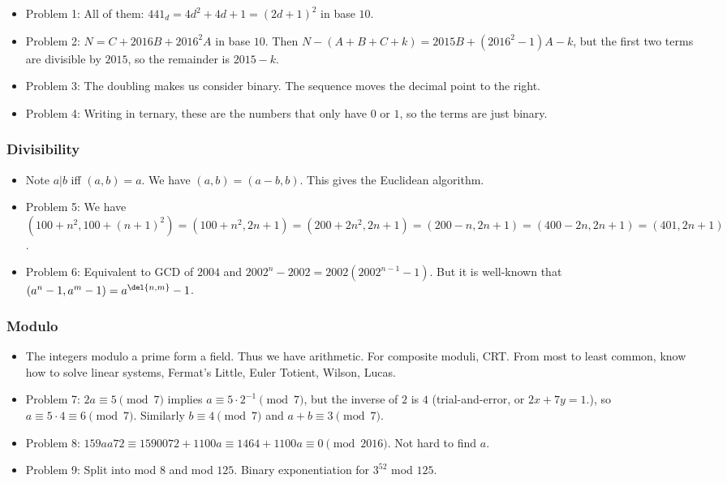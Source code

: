 \documentclass[10pt,paper=letter]{scrartcl}
\begin{document}
\begin{itemize}
  \item Problem 1: All of them: $441_d = 4d^2 + 4d + 1 = (2d + 1)^2$ in base $10$.
  \item Problem 2: $N = C + 2016B + 2016^2A$ in base $10$. Then $N - (A + B + C + k) = 2015B + (2016^2-1)A - k$, but the first two terms are divisible by $2015$, so the remainder is $2015-k$.
  \item Problem 3: The doubling makes us consider binary. The sequence moves the decimal point to the right.
  \item Problem 4: Writing in ternary, these are the numbers that only have $0$ or $1$, so the terms are just binary.
\end{itemize}

\subsubsection*{Divisibility}

\begin{itemize}
  \item Note $a|b$ iff $(a, b) = a$. We have $(a, b) = (a-b, b)$. This gives the Euclidean algorithm.
  \item Problem 5: We have $(100 + n^2, 100 + (n+1)^2) = (100 + n^2, 2n + 1) = (200 + 2n^2, 2n + 1) = (200 - n, 2n + 1) = (400-2n, 2n+1) = (401, 2n+1)$.
  \item Problem 6: Equivalent to GCD of $2004$ and $2002^n - 2002 = 2002(2002^{n-1} -1)$. But it is well-known that $(a^n - 1, a^m - 1) = a^{\del{n, m}} - 1$.
\end{itemize}

\subsubsection*{Modulo}

\begin{itemize}
  \item The integers modulo a prime form a field. Thus we have arithmetic. For composite moduli, CRT. From most to least common, know how to solve linear systems, Fermat's Little, Euler Totient, Wilson, Lucas.
  \item Problem 7: $2a \equiv 5 \pmod 7$ implies $a \equiv 5\cdot2^{-1} \pmod 7$, but the inverse of $2$ is $4$ (trial-and-error, or $2x+7y=1$.), so $a \equiv 5\cdot4 \equiv 6 \pmod 7$. Similarly $b \equiv 4 \pmod 7$ and $a+b \equiv 3 \pmod 7$.
  \item Problem 8: $159aa72 \equiv 1590072 + 1100a \equiv 1464 + 1100a \equiv 0 \pmod{2016}$. Not hard to find $a$.
  \item Problem 9: Split into mod $8$ and mod $125$. Binary exponentiation for $3^{52}$ mod $125$.
\end{itemize}
\end{document}
